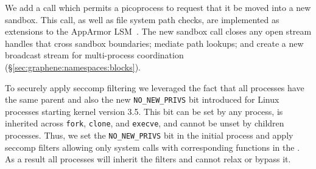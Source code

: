 We add a \pal{} call which
permits a picoprocess to request that it be moved into a new sandbox.
This call, as well as file system path checks, are implemented
as extensions to the  AppArmor LSM~\cite{apparmor}.
The new sandbox call closes any open stream handles that cross sandbox boundaries;
mediate path lookups;
and create a new broadcast stream for multi-process
 coordination (\S\ref{sec:graphene:namespaces:blocks}).

To securely apply seccomp filtering we leveraged the fact that all
\graphene{} processes have the same parent and also the new
{\tt NO\_NEW\_PRIVS} bit introduced for Linux processes starting kernel
version 3.5. This bit can be set by any process, is inherited across
{\tt fork}, {\tt clone}, and {\tt execve}, and cannot be unset by
children processes. Thus, we set the {\tt NO\_NEW\_PRIVS} bit in the initial
\graphene{} process and apply seccomp filters allowing only system calls
with corresponding functions in the \pal{}. As a result all \graphene{}
processes will inherit the filters and cannot relax or bypass it.





